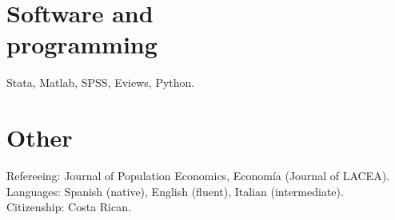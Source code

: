 \documentclass[margin]{res} %
\begin{document}
\begin{resume}
\section{Software and \\ programming}
Stata, Matlab, SPSS, Eviews, Python. \\

\section{Other}
Refereeing: Journal of Population Economics, Econom\'ia (Journal of LACEA). \\
Languages: Spanish (native), English (fluent), Italian (intermediate). \\
Citizenship: Costa Rican.





\end{resume}
\end{document}
